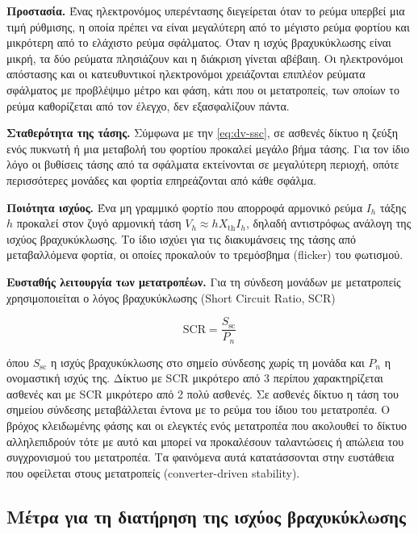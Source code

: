 \textbf{Προστασία.} Ένας ηλεκτρονόμος υπερέντασης διεγείρεται όταν το ρεύμα υπερβεί μια τιμή
ρύθμισης, η οποία πρέπει να είναι μεγαλύτερη από το μέγιστο ρεύμα φορτίου και μικρότερη από το
ελάχιστο ρεύμα σφάλματος. Όταν η ισχύς βραχυκύκλωσης είναι μικρή, τα δύο ρεύματα πλησιάζουν και
η διάκριση γίνεται αβέβαιη. Οι ηλεκτρονόμοι απόστασης και οι κατευθυντικοί ηλεκτρονόμοι
χρειάζονται επιπλέον ρεύματα σφάλματος με προβλέψιμο μέτρο και φάση, κάτι που οι μετατροπείς,
των οποίων το ρεύμα καθορίζεται από τον έλεγχο, δεν εξασφαλίζουν πάντα.

\textbf{Σταθερότητα της τάσης.} Σύμφωνα με την \eqref{eq:dv-ssc}, σε ασθενές δίκτυο η ζεύξη
ενός πυκνωτή ή μια μεταβολή του φορτίου προκαλεί μεγάλο βήμα τάσης. Για τον ίδιο λόγο οι
βυθίσεις τάσης από τα σφάλματα εκτείνονται σε μεγαλύτερη περιοχή, οπότε περισσότερες μονάδες
και φορτία επηρεάζονται από κάθε σφάλμα.

\textbf{Ποιότητα ισχύος.} Ένα μη γραμμικό φορτίο που απορροφά αρμονικό ρεύμα $I_h$ τάξης $h$
προκαλεί στον ζυγό αρμονική τάση $V_h \approx h X_{\mathrm{th}} I_h$, δηλαδή αντιστρόφως ανάλογη
της ισχύος βραχυκύκλωσης. Το ίδιο ισχύει για τις διακυμάνσεις της τάσης από μεταβαλλόμενα
φορτία, οι οποίες προκαλούν το τρεμόσβημα (flicker) του φωτισμού.

\textbf{Ευσταθής λειτουργία των μετατροπέων.} Για τη σύνδεση μονάδων με μετατροπείς
χρησιμοποιείται ο λόγος βραχυκύκλωσης (Short Circuit Ratio, SCR)

\begin{equation}
\mathrm{SCR} = \frac{S_{\mathrm{sc}}}{P_n}
\label{eq:scr}
\end{equation}

όπου $S_{\mathrm{sc}}$ η ισχύς βραχυκύκλωσης στο σημείο σύνδεσης χωρίς τη μονάδα και $P_n$ η
ονομαστική ισχύς της. Δίκτυο με SCR μικρότερο από 3 περίπου χαρακτηρίζεται ασθενές και με SCR
μικρότερο από 2 πολύ ασθενές. Σε ασθενές δίκτυο η τάση του σημείου σύνδεσης μεταβάλλεται
έντονα με το ρεύμα του ίδιου του μετατροπέα. Ο βρόχος κλειδωμένης φάσης και οι ελεγκτές ενός
μετατροπέα που ακολουθεί το δίκτυο αλληλεπιδρούν τότε με αυτό και μπορεί να προκαλέσουν
ταλαντώσεις ή απώλεια του συγχρονισμού του μετατροπέα. Τα φαινόμενα αυτά κατατάσσονται στην
ευστάθεια που οφείλεται στους μετατροπείς (converter-driven stability).

\subsection{Μέτρα για τη διατήρηση της ισχύος βραχυκύκλωσης}
\label{sec:ssc-measures}

